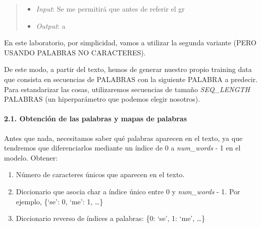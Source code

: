 \documentclass[11pt]{article}
\providecommand{\tightlist}{%
      \setlength{\itemsep}{0pt}\setlength{\parskip}{0pt}}
\begin{document}
\begin{quote}
\begin{itemize}
\tightlist
\item
  \emph{Input}: Se me permitirá que antes de referir el gr
\item
  \emph{Output}: a
\end{itemize}
\end{quote}

En este laboratorio, por simplicidad, vamos a utilizar la segunda
variante (PERO USANDO PALABRAS NO CARACTERES).

De este modo, a partir del texto, hemos de generar nuestro propio
training data que consista en secuencias de PALABRAS con la siguiente
PALABRA a predecir. Para estandarizar las cosas, utilizaremos secuencias
de tamaño \emph{SEQ\_LENGTH} PALABRAS (un hiperparámetro que podemos
elegir nosotros).

    \paragraph{2.1. Obtención de las palabras y mapas de
palabras}\label{obtenciuxf3n-de-las-palabras-y-mapas-de-palabras}

Antes que nada, necesitamos saber qué palabras aparecen en el texto, ya
que tendremos que diferenciarlos mediante un índice de 0 a
\emph{num\_words} - 1 en el modelo. Obtener:

\begin{enumerate}
\def\labelenumi{\arabic{enumi}.}
\tightlist
\item
  Número de caracteres únicos que aparecen en el texto.
\item
  Diccionario que asocia char a índice único entre 0 y \emph{num\_words}
  - 1. Por ejemplo, \{`se': 0, `me': 1, \ldots\}
\item
  Diccionario reverso de índices a palabras: \{0: `se', 1: `me',
  \ldots\}
\end{enumerate}
\end{document}
